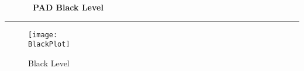 % 
% 
% 
% 
% 
%
\cleardoublepage
\begin{figure*}[h!]
  \centering
  \hfill
  {\Huge {\bf \quarter\ PAD Black Level}}
  \hfill
\end{figure*}
\hrule
\begin{figure*}[h!]
  \centering
  \texttt{[image: \\BlackPlot]}
  \caption{Black Level}
\end{figure*}

